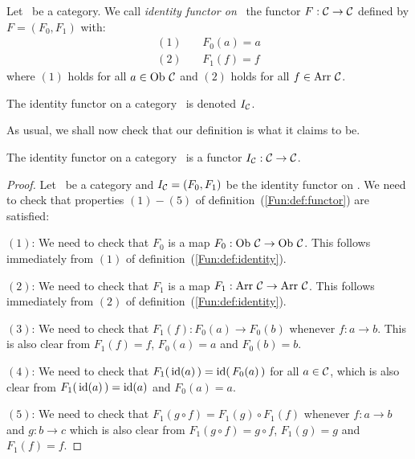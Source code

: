 \begin{defin}\label{Fun:def:identity}
    Let \Cat\ be a category. We call {\em identity functor on} \Cat\ the 
    functor $F:\mbox{$\cal C$}\to\mbox{$\cal C$}$ defined by $F=(F_{0},F_{1})$ with:
        \begin{eqnarray*}
            (1)&\ &F_{0}(a) = a\\
            (2)&\ &F_{1}(f) = f
        \end{eqnarray*}
    where $(1)$ holds for all $a\in\mbox{\rm Ob}\ \mbox{$\cal C$}$ and $(2)$ holds for all
    $f\in\mbox{\rm Arr}\ \mbox{$\cal C$}$.
\end{defin}

\begin{notation}\label{Fun:notation:identity}
    The identity functor on a category \Cat\ is denoted $I_{\cal C}$.
\end{notation}

\noindent
As usual, we shall now check that our definition is what it claims to be.

\begin{prop}\label{Fun:prop:identity}
    The identity functor on a category \Cat\ is a functor $I_{\cal C}:
    \mbox{$\cal C$}\to\mbox{$\cal C$}$.
\end{prop}
\begin{proof}
    Let \Cat\ be a category and $I_{\cal C}=(F_{0},F_{1})$ be the identity
    functor on \Cat. We need to check that properties $(1)-(5)$ of
    definition~(\ref{Fun:def:functor}) are satisfied:

    $(1)$: We need to check that $F_{0}$ is a map $F_{0}:\ob\ \Cat \to\ob\ \Cat$. 
    This follows immediately from $(1)$ of definition~(\ref{Fun:def:identity}).

    $(2)$: We need to check that $F_{1}$ is a map $F_{1}:\arr\ \Cat\to\arr\ \Cat$.
    This follows immediately from $(2)$ of definition~(\ref{Fun:def:identity}).

    $(3)$: We need to check that $F_{1}(f):F_{0}(a)\to F_{0}(b)$ whenever 
    $f:a\to b$. This is also clear from $F_{1}(f)=f$, $F_{0}(a)=a$ and
    $F_{0}(b)=b$.

    $(4)$: We need to check that $F_{1}(\,\mbox{\rm id}(a)\,)=\mbox{\rm id}(\,F_{0}(a)\,)$ for
    all $a\in\mbox{$\cal C$}$, which is also clear from $F_{1}(\,\mbox{\rm id}(a)\,)=\mbox{\rm id}(a)$
    and $F_{0}(a)=a$.

    $(5)$: We need to check that $F_{1}(g\circ f)=F_{1}(g)\circ F_{1}(f)$
    whenever $f:a\to b$ and $g:b\to c$ which is also clear from
    $F_{1}(g\circ f) = g\circ f$, $F_{1}(g)=g$ and $F_{1}(f)=f$.
\end{proof}

